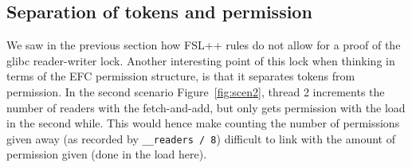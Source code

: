 	\subsection{Separation of tokens and permission}
We saw in the previous section how FSL++ rules do not allow for a proof of the glibc reader-writer lock. Another interesting point of this lock when thinking in terms of the EFC permission structure, is that it separates tokens from permission. In the second scenario Figure~\ref{fig:scen2}, thread 2 increments the number of readers with the fetch-and-add, but only gets permission with the load in the second while. This would hence make counting the number of permissions given away (as recorded by \texttt{\_\_readers / 8}) difficult to link with the amount of permission given (done in the load here).
